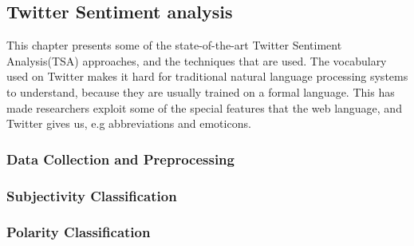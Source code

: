 \subsection{Twitter Sentiment analysis}
	This chapter presents some of the state-of-the-art Twitter Sentiment Analysis(TSA) approaches, and the techniques that are used. The vocabulary used on Twitter makes it hard for traditional natural language processing systems to understand, because they are usually trained on a formal language. This has made researchers exploit some of the special features that the web language, and Twitter gives us, e.g abbreviations and emoticons.
	
		\subsubsection{Data Collection and Preprocessing}
		
		
		\subsubsection{Subjectivity Classification}
		
		
		\subsubsection{Polarity Classification}
		
